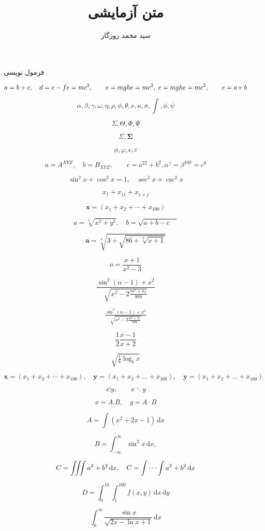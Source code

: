 \documentclass[12pt]{article}
\title{متن آزمایشی}
\author{سید محمد روزگار}
\begin{document}
\maketitle

فرمول نویسی

\[
a = b + c,\quad d=e-f\\
e = mc^2 ,\qquad e = mgh
e = mc^2 ,\; e = mgh
e = mc^2 ,\qquad e = a\!+ b 
\]

\[
\alpha,\beta,\gamma,\omega,\eta,\rho,\phi,\theta,\nu,\kappa,\sigma,\int,\phi,\psi
\]

\[
\Sigma,\Theta,\Phi,\Psi
\]

\[
\Sigma,\boldsymbol{\Sigma}
\]

\[
\phi,\varphi,\epsilon,\varepsilon
\]

\[
a = A^{XYZ},\quad b= B_{XYZ},\qquad c = a^{22}+b^{2},\alpha^{\gamma} = \beta^{100} = c^9
\]

\[
\sin^2x + \cos^2x=1,\quad \sec^2x+\csc^2x
\]

\[
x_1 + x_{11} + x_{1+j}
\]


\[
\mathbf{x} = (x_1+x_2+\cdots+x_{100})
\]

\[
a = \sqrt[5]{x^2+y^2},\quad b = \sqrt{a+b-c\quad}
\]

\[
\mathbf{a} = \sqrt[4]{3+\sqrt{86+\sqrt[3]{x+1}}}
\]

\[
a = \frac{x+1}{x^2-3}
\]

\[
\frac{\sin^2(\alpha - 1)+x^2}{\sqrt{x^\beta-2\frac{m^2+n_1}{999}}}
\]

\[
\tfrac{\sin^2(\alpha - 1)+x^2}{\sqrt{x^\beta-2\tfrac{m^2+n_1}{999}}}
\]

\[
\frac12 \frac{x-1}{x+2}
\]

\[
\sqrt{\tfrac{1}{k}\log_bx}
\]

\[
\mathbf{x} = (x_1+x_2+\cdots+x_{100}),\quad \mathbf{y} = (x_1+x_2+\dots+x_{100}),\quad \mathbf{y} = (x_1+x_2+\ldots+x_{100})
\]

\[
x \vdots y,\qquad x \ddots y
\]

\[
x = A.B,\quad y = A \cdot B
\]

\[
A = \int (x^2+2x-1)\,\mathrm{d}x
\]

\[
B = \int_{-\infty}^{\infty} \sin^2x\,\mathrm{d}x,
\]

\[
C = \iiint a^2+b^2 \, \mathrm{d}x,\quad C = \idotsint a^2+b^2 \, \mathrm{d}x
\]

\[
D = \int_{0}^{10} \int_{1}^{100} f(x,y)\,\mathrm{d}x\,\mathrm{d}y
\]

\[
\int_{0}^{\infty}\frac{\sin{x}}{\sqrt{2x-\ln x+1}}\,\mathrm{d}x
\]
\end{document}
